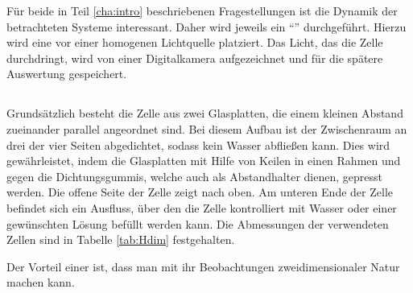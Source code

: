 \label{cha:set}


Für beide in Teil \ref{cha:intro} beschriebenen Fragestellungen ist die Dynamik der betrachteten Systeme interessant. Daher wird jeweils ein ``\LTM''
durchgeführt. Hierzu wird eine \HSC vor einer homogenen Lichtquelle platziert. Das Licht, das die Zelle durchdringt, wird von einer Digitalkamera aufgezeichnet
und für die spätere Auswertung gespeichert.

\subsection{\HSC}
\label{sec:hsc}
Grundsätzlich besteht die Zelle aus zwei Glasplatten, die einem kleinen Abstand zueinander parallel angeordnet sind. Bei diesem Aufbau ist der Zwischenraum an
drei der vier Seiten abgedichtet, sodass kein Wasser abfließen kann. Dies wird gewährleistet, indem die Glasplatten mit Hilfe von Keilen in einen Rahmen und
gegen die Dichtungsgummis, welche auch als Abstandhalter dienen, gepresst werden. 
Die offene Seite der Zelle zeigt nach oben. Am unteren Ende der Zelle befindet sich ein Ausfluss, über den die Zelle kontrolliert mit Wasser oder einer
gewünschten Lösung befüllt werden kann.
Die Abmessungen der verwendeten Zellen sind in Tabelle \ref{tab:Hdim} festgehalten.


Der Vorteil einer \HSC ist, dass man mit ihr Beobachtungen zweidimensionaler Natur machen kann.


